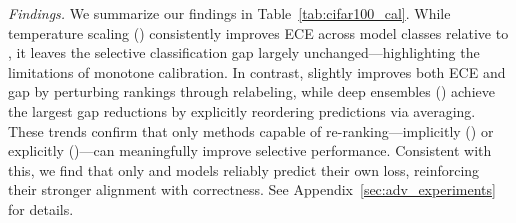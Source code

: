 \emph{Findings.}
We summarize our findings in Table~\ref{tab:cifar100_cal}. While temperature scaling (\temp) consistently improves ECE across model classes relative to \msp, it leaves the selective classification gap largely unchanged—highlighting the limitations of monotone calibration. In contrast, \sat slightly improves both ECE and gap by perturbing rankings through relabeling, while deep ensembles (\de) achieve the largest gap reductions by explicitly reordering predictions via averaging. These trends confirm that only methods capable of re-ranking—implicitly (\sat) or explicitly (\de)—can meaningfully improve selective performance. Consistent with this, we find that only \sat and \de models reliably predict their own loss, reinforcing their stronger alignment with correctness. See Appendix~\ref{sec:adv_experiments} for details.


